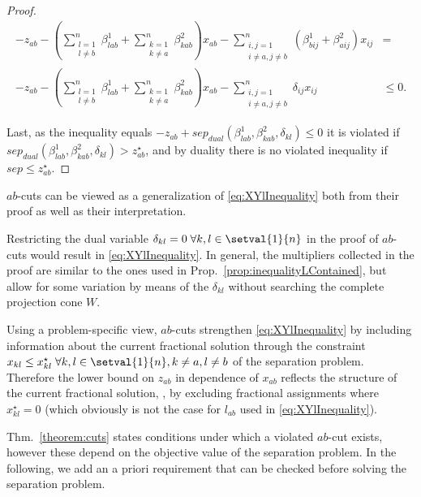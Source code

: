 \begin{proof}
\begin{align*}
		-z_{ab} - \left(\sum_{\substack{l=1\\l\neq b}}^n \beta^1_{lab} + \sum_{\substack{k=1\\k\neq a}}^n\beta^2_{kab}\right)x_{ab} - \sum_{\substack{i,j=1\\i\neq a, j\neq b}}^n\left(\beta^1_{bij}+\beta^2_{aij}\right)x_{ij}& =\\
		-z_{ab} - \left(\sum_{\substack{l=1\\l\neq b}}^n \beta^1_{lab} + \sum_{\substack{k=1\\k\neq a}}^n\beta^2_{kab}\right)x_{ab} - \sum_{\substack{i,j=1\\i\neq a, j\neq b}}^n\delta_{ij}x_{ij}& \leq 0.
	\end{align*}
	
	Last, as the inequality equals $-z_{ab} + sep_{dual}(\beta^1_{lab}, \beta^2_{kab}, \delta_{kl}) \leq 0$ it is violated if $sep_{dual}(\beta^1_{lab}, \beta^2_{kab}, \delta_{kl}) > z^\star_{ab}$, and by duality there is no violated inequality if $sep \leq z^\star_{ab}$.
\end{proof}

\begin{remark}
	$ab$-cuts can be viewed as a generalization of \eqref{eq:XYlInequality} both from their proof as well as their interpretation. 
	
	Restricting the dual variable $\delta_{kl}=0\;\forall k,l\in\setval{1}{n}$ in the proof of $ab$-cuts would result in \eqref{eq:XYlInequality}. In general, the multipliers collected in the proof are similar to the ones used in Prop.~\ref{prop:inequalityLContained}, but allow for some variation by means of the $\delta_{kl}$ without searching the complete projection cone $W$.
	
	Using a problem-specific view, $ab$-cuts strengthen \eqref{eq:XYlInequality} by including information about the current fractional solution through the constraint $x_{kl}\leq x^\star_{kl}\;\forall k,l\in\setval{1}{n}, k\neq a, l\neq b$ of the separation problem. Therefore the lower bound on $z_{ab}$ in dependence of $x_{ab}$ reflects the structure of the current fractional solution, \eg,  by excluding fractional assignments where $x^\star_{kl} = 0$ (which obviously is not the case for $l_{ab}$ used in \eqref{eq:XYlInequality}).
\end{remark}

Thm.~\ref{theorem:cuts} states conditions under which a violated $ab$-cut exists, however these depend on the objective value of the separation problem. In the following, we add an a priori requirement that can be checked before solving the separation problem.


